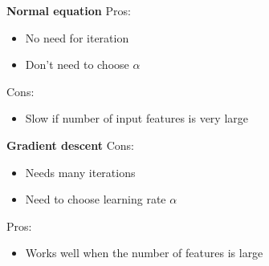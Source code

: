 \documentclass[CS5104-Notes.tex]{subfiles}
\begin{document}
\begin{minipage}{0.45\textwidth}
\textbf{Normal equation} \n
Pros:
\begin{itemize}
\item No need for iteration
\item Don't need to choose $\alpha$
\end{itemize}
Cons:
\begin{itemize}
\item Slow if number of input features is very large
\end{itemize}
\end{minipage}
\hspace*{\fill}
\begin{minipage}{0.45\textwidth}
\textbf{Gradient descent} \n
Cons:
\begin{itemize}
\item Needs many iterations
\item Need to choose learning rate $\alpha$
\end{itemize}
Pros:
\begin{itemize}
\item Works well when the number of features is large
\end{itemize}
\end{minipage}
\end{document}
